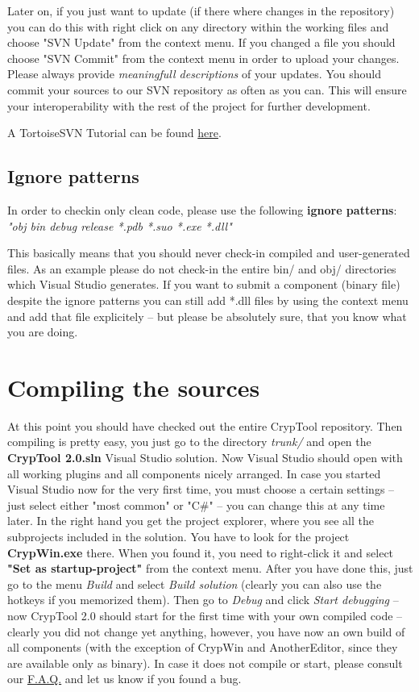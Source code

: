Later on, if you just want to update (if there where changes in the repository) you can do this with right click on any directory within the working files and choose "SVN Update" from the context menu. If you changed a file you should choose "SVN Commit" from the context menu in order to upload your changes. Please always provide \textit{meaningfull descriptions} of your updates. You should commit your sources to our SVN repository as often as you can. This will ensure your interoperability with the rest of the project for further development.

A TortoiseSVN Tutorial can be found \href{http://www.mind.ilstu.edu/research/robots/iris4/developers/svntutorial}{here}.

\subsection*{Ignore patterns}

In order to checkin only clean code, please use the following \textbf{ignore patterns}: \textit{"obj bin debug release *.pdb *.suo *.exe *.dll"}

This basically means that you should never check-in compiled and user-generated files. As an example please do not check-in the entire bin/ and obj/ directories which Visual Studio generates. If you want to submit a component (binary file) despite the ignore patterns you can still add *.dll files by using the context menu and add that file explicitely -- but please be absolutely sure, that you know what you are doing.

\section{Compiling the sources}

At this point you should have checked out the entire CrypTool repository. Then compiling is pretty easy, you just go to the directory \textit{trunk/} and open the \textbf{CrypTool 2.0.sln} Visual Studio solution. Now Visual Studio should open with all working plugins and all components nicely arranged. In case you started Visual Studio now for the very first time, you must choose a certain settings -- just select either "most common" or "C\#" -- you can change this at any time later. In the right hand you get the project explorer, where you see all the subprojects included in the solution. You have to look for the project \textbf{CrypWin.exe} there. When you found it, you need to right-click it and select \textbf{"Set as startup-project"} from the context menu. After you have done this, just go to the menu \textit{Build} and select \textit{Build solution} (clearly you can also use the hotkeys if you memorized them). Then go to \textit{Debug} and click \textit{Start debugging} -- now CrypTool 2.0 should start for the first time with your own compiled code -- clearly you did not change yet anything, however, you have now an own build of all components (with the exception of CrypWin and AnotherEditor, since they are available only as binary). In case it does not compile or start, please consult our \href{https://www.cryptool.org/trac/CrypTool2/wiki/FAQ}{F.A.Q.} and let us know if you found a bug.

